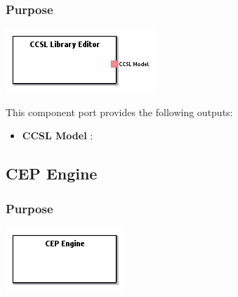 \documentclass{gemoc} %
\begin{document}

\subsubsection{Purpose}


\begin{center}
\includegraphics*[trim=0.0cm 0.0cm 0cm 0.0cm, clip=true]{../images/generated/Generated_CCSL_Library_Editor.png}
\end{center}


This component port provides the following outputs:
\begin{itemize}
  \item \textbf{CCSL Model} :
\end{itemize}


\subsection{CEP Engine}


\subsubsection{Purpose}


\begin{center}
\includegraphics*[trim=0.0cm 0.0cm 0cm 0.0cm, clip=true]{../images/generated/Generated_CEP_Engine.png}
\end{center}




\end{document}
